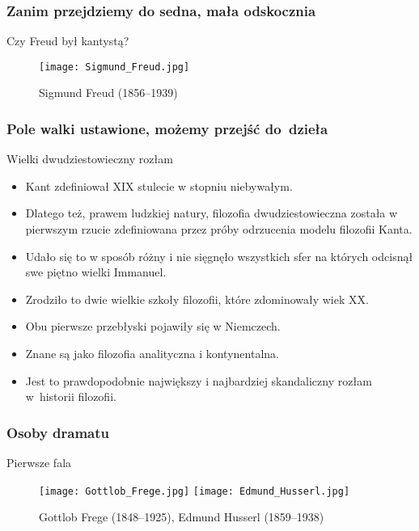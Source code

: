 \documentclass{beamer}  %
\begin{document}
\begin{frame}
  \frametitle{Zanim przejdziemy do sedna, mała odskocznia}

  \begin{block}{Czy Freud był kantystą?}
    \begin{figure}
      \centering

      \texttt{[image: Sigmund\_Freud.jpg]}

      \caption{Sigmund Freud (1856--1939)}
    \end{figure}
  \end{block}

\end{frame}



\begin{frame}
  \frametitle{Pole walki ustawione, możemy przejść do~dzieła}

  \begin{block}{Wielki dwudziestowieczny rozłam}
    \pause
    \begin{itemize}
    \item Kant zdefiniował XIX stulecie w stopniu niebywałym.
    \item Dlatego też, prawem ludzkiej natury, filozofia
      dwudziestowieczna została w pierwszym rzucie zdefiniowana przez
      próby odrzucenia modelu filozofii Kanta.
    \item Udało się to w sposób różny i nie sięgnęło wszystkich sfer
      na których odcisnął swe piętno wielki Immanuel.
    \item Zrodziło to dwie wielkie szkoły filozofii, które zdominowały
      wiek XX.
    \item Obu pierwsze przebłyski pojawiły się w Niemczech.
    \item Znane są jako filozofia analityczna i kontynentalna.
    \item Jest to prawdopodobnie największy i najbardziej skandaliczny
      rozłam w~historii filozofii.
    \end{itemize}
  \end{block}

\end{frame}



\begin{frame}
  \frametitle{Osoby dramatu}
  \pause

  \begin{block}{Pierwsze fala}
    \begin{figure}
      \centering

      \texttt{[image: Gottlob\_Frege.jpg]}
      \texttt{[image: Edmund\_Husserl.jpg]}

      \caption{Gottlob Frege (1848--1925), Edmund Husserl
        (1859--1938)}
    \end{figure}
  \end{block}

\end{frame}
\end{document}

